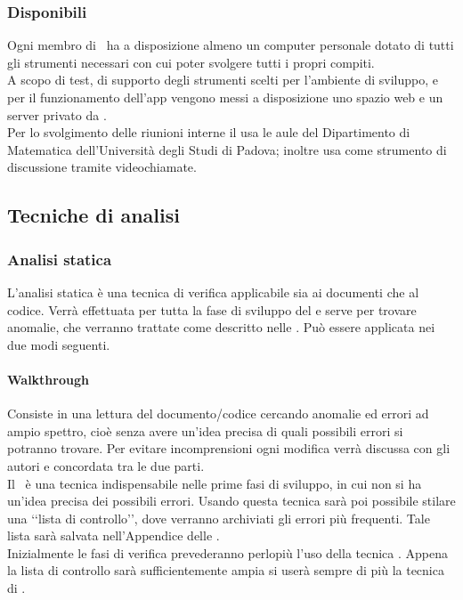 		\subsubsection{Disponibili}
			Ogni membro di \AUTORE\ ha a disposizione almeno un computer personale dotato di tutti gli strumenti necessari con cui poter svolgere tutti i propri compiti. \\
			A scopo di test, di supporto degli strumenti scelti per l'ambiente di sviluppo, e per il funzionamento dell'app vengono messi a disposizione uno spazio web e un server privato da \PROPONENTE. \\
			Per lo svolgimento delle riunioni interne il  usa le aule del Dipartimento di Matematica dell'Università degli Studi di Padova; inoltre usa  come strumento di discussione tramite videochiamate.
	\subsection{Tecniche di analisi}
		\label{sec:3.8}
		\subsubsection{Analisi statica}
			L'analisi statica è una tecnica di verifica applicabile sia ai documenti che al codice. Verrà effettuata per tutta la fase di sviluppo del  e serve per trovare anomalie, che verranno trattate come descritto nelle \NPdoc. Può essere applicata nei due modi seguenti.
			\paragraph{Walkthrough}
				Consiste in una lettura del documento/codice cercando anomalie ed errori ad ampio spettro, cioè senza avere un'idea precisa di quali possibili errori si potranno trovare. Per evitare incomprensioni ogni modifica verrà discussa con gli autori e concordata tra le due parti. \\
				Il \ è una tecnica indispensabile nelle prime fasi di sviluppo, in cui non si ha un'idea precisa dei possibili errori. Usando questa tecnica sarà poi possibile stilare una ‘‘lista di controllo’’, dove verranno archiviati gli errori più frequenti. Tale lista sarà salvata nell'Appendice delle \NPdoc. \\ %
				Inizialmente le fasi di verifica prevederanno perlopiù l'uso della tecnica . Appena la lista di controllo sarà sufficientemente ampia si userà sempre di più la tecnica di .
